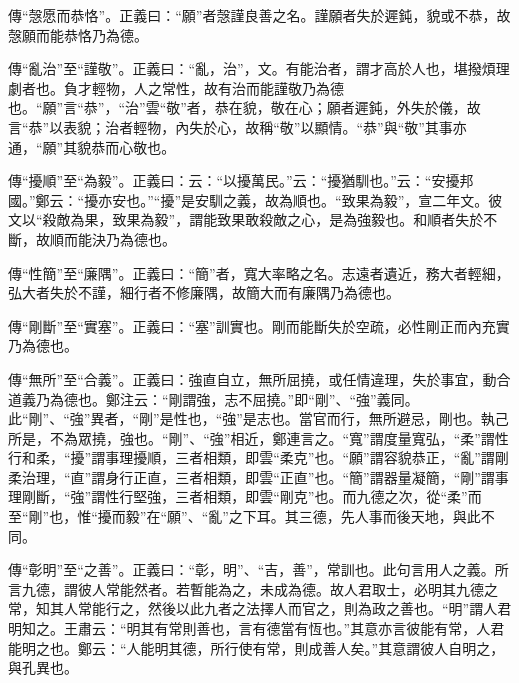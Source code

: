 {\noindent\zhuan{}\fzbyks 傳“愨愿而恭恪”。正義曰：“願”者愨謹良善之名。謹願者失於遲鈍，貌或不恭，故愨願而能恭恪乃為德。 \par}

{\noindent\zhuan{}\fzbyks 傳“亂治”至“謹敬”。正義曰：“亂，治”，文。有能治者，謂才高於人也，堪撥煩理劇者也。負才輕物，人之常性，故有治而能謹敬乃為德也。“願”言“恭”，“治”雲“敬”者，恭在貌，敬在心；願者遲鈍，外失於儀，故言“恭”以表貌；治者輕物，內失於心，故稱“敬”以顯情。“恭”與“敬”其事亦通，“願”其貌恭而心敬也。 \par}

{\noindent\zhuan{}\fzbyks 傳“擾順”至“為毅”。正義曰：云：“以擾萬民。”云：“擾猶馴也。”云：“安擾邦國。”鄭云：“擾亦安也。”“擾”是安馴之義，故為順也。“致果為毅”，宣二年文。彼文以“殺敵為果，致果為毅”，謂能致果敢殺敵之心，是為強毅也。和順者失於不斷，故順而能決乃為德也。 \par}

{\noindent\zhuan{}\fzbyks 傳“性簡”至“廉隅”。正義曰：“簡”者，寬大率略之名。志遠者遺近，務大者輕細，弘大者失於不謹，細行者不修廉隅，故簡大而有廉隅乃為德也。 \par}

{\noindent\zhuan{}\fzbyks 傳“剛斷”至“實塞”。正義曰：“塞”訓實也。剛而能斷失於空疏，必性剛正而內充實乃為德也。 \par}

{\noindent\zhuan{}\fzbyks 傳“無所”至“合義”。正義曰：強直自立，無所屈撓，或任情違理，失於事宜，動合道義乃為德也。鄭注云：“剛謂強，志不屈撓。”即“剛”、“強”義同。此“剛”、“強”異者，“剛”是性也，“強”是志也。當官而行，無所避忌，剛也。執己所是，不為眾撓，強也。“剛”、“強”相近，鄭連言之。“寬”謂度量寬弘，“柔”謂性行和柔，“擾”謂事理擾順，三者相類，即雲“柔克”也。“願”謂容貌恭正，“亂”謂剛柔治理，“直”謂身行正直，三者相類，即雲“正直”也。“簡”謂器量凝簡，“剛”謂事理剛斷，“強”謂性行堅強，三者相類，即雲“剛克”也。而九德之次，從“柔”而至“剛”也，惟“擾而毅”在“願”、“亂”之下耳。其三德，先人事而後天地，與此不同。 \par}

{\noindent\zhuan{}\fzbyks 傳“彰明”至“之善”。正義曰：“彰，明”、“吉，善”，常訓也。此句言用人之義。所言九德，謂彼人常能然者。若暫能為之，未成為德。故人君取士，必明其九德之常，知其人常能行之，然後以此九者之法擇人而官之，則為政之善也。“明”謂人君明知之。王肅云：“明其有常則善也，言有德當有恆也。”其意亦言彼能有常，人君能明之也。鄭云：“人能明其德，所行使有常，則成善人矣。”其意謂彼人自明之，與孔異也。 \par}

